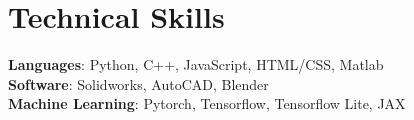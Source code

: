 \section{Technical Skills}
 \begin{itemize}[leftmargin=0.15in, label={}]
    \small{\item{
     \textbf{Languages}{: Python, C++, JavaScript, HTML/CSS, Matlab} \\
     \textbf{Software}{: Solidworks, AutoCAD, Blender} \\
     \textbf{Machine Learning}{: Pytorch, Tensorflow, Tensorflow Lite, JAX} \\

    }}
 \end{itemize}
